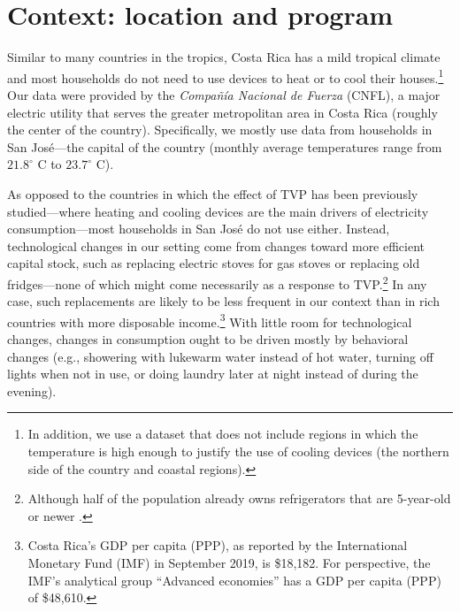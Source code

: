 \documentclass[12pt]{article}
\begin{document}
\section{Context: location and program}

Similar to many countries in the tropics, Costa Rica has a mild tropical climate and most households do not need to use devices to heat or to cool their houses.\footnote{In addition, we use a dataset that does not include regions in which the temperature is high enough to justify the use of cooling devices (the northern side of the country and coastal regions).} Our data were provided by the \emph{Compañía Nacional de Fuerza} (CNFL), a major electric utility that serves the greater metropolitan area in Costa Rica (roughly the center of the country). Specifically, we mostly use data from households in San José---the capital of the country (monthly average temperatures range from $21.8 ^{\circ}$  C to $23.7^{\circ}$ C).

As opposed to the countries in which the effect of TVP has been previously studied---where heating and cooling devices are the main drivers of electricity consumption---most households in San José do not use either. Instead, technological changes in our setting come from changes toward more efficient capital stock, such as replacing electric stoves for gas stoves or replacing old fridges---none of which might come necessarily as a response to TVP.\footnote{ Although half of the population already owns refrigerators that are 5-year-old or newer \citep{ministeriodeambienteyenergiaEstudioParaCaracterizacion2019}.} In any case, such replacements are likely to be less frequent in our context than in rich countries with more disposable income.\footnote{Costa Rica’s GDP per capita (PPP), as reported by the International Monetary Fund (IMF) in September 2019, is \$18,182. For perspective, the IMF’s analytical group \enquote{Advanced economies} has a GDP per capita (PPP) of \$48,610.} With little room for technological changes, changes in consumption ought to be driven mostly by behavioral changes (e.g., showering with lukewarm water instead of hot water, turning off lights when not in use, or doing laundry later at night instead of during the evening).
\end{document}
